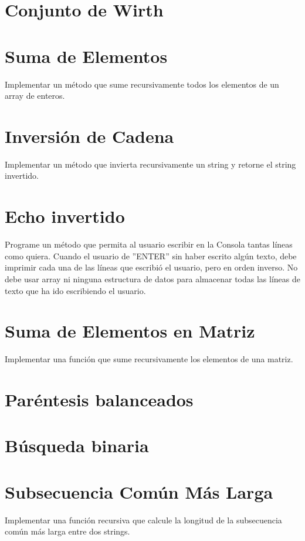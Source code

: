 \section{Conjunto de Wirth}


\section{Suma de Elementos}
Implementar un método que sume recursivamente todos los elementos de un array de enteros.

\section{Inversión de Cadena}
Implementar un método que invierta recursivamente un string y retorne el string invertido.

\section{Echo invertido}
Programe un método que permita al usuario escribir en la Consola tantas líneas como quiera. Cuando el usuario de ''ENTER'' sin haber escrito algún texto, debe imprimir cada una de las líneas que escribió el usuario, pero en orden inverso. No debe usar array ni ninguna estructura de datos para almacenar todas las líneas de texto que ha ido escribiendo el usuario.
        
\section{Suma de Elementos en Matriz}
Implementar una función que sume recursivamente los elementos de una matriz.

\section{Paréntesis balanceados}


\section{Búsqueda binaria}


\section{Subsecuencia Común Más Larga}
Implementar una función recursiva que calcule la longitud de la subsecuencia común más larga entre dos strings.

